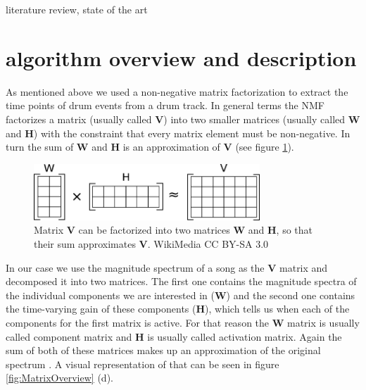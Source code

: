 \documentclass{article}
\begin{document}
\noindent\makebox[\linewidth]{\rule{\linewidth}{0.4pt}}
literature review, state of the art




\section{algorithm overview and description}
\label{sec:algo}

As mentioned above we used a non-negative matrix factorization to extract the time points of drum events from a drum track.
In general terms the NMF factorizes a matrix (usually called $\mathbf{V}$) into two smaller matrices (usually called $\mathbf{W}$ and $\mathbf{H}$) with the constraint that every matrix element must be non-negative.
In turn the sum of $\mathbf{W}$ and $\mathbf{H}$ is an approximation of $\mathbf{V}$ (see figure \ref{fig:NMF}).

\begin{figure}[htb]

\begin{minipage}[b]{1.0\linewidth}
  \centering
  \centerline{\includegraphics[width=8.5cm]{figures/NMF}}
  \medskip
\end{minipage}

\caption{Matrix $\mathbf{V}$ can be factorized into two matrices $\mathbf{W}$ and $\mathbf{H}$, so that their sum approximates $\mathbf{V}$. \scriptsize{\textsf{\textcopyright} WikiMedia CC BY-SA 3.0}}
\label{fig:NMF}

\end{figure}

In our case we use the magnitude spectrum of a song as the $\mathbf{V}$ matrix and decomposed it into two matrices.
The first one contains the magnitude spectra of the individual components we are interested in ($\mathbf{W}$) and the second one contains the time-varying gain of these components ($\mathbf{H}$), which tells us when each of the components for the first matrix is active.
For that reason the $\mathbf{W}$ matrix is usually called component matrix and $\mathbf{H}$ is usually called activation matrix.
Again the sum of both of these matrices makes up an approximation of the original spectrum \cite{smaragdis2003}.
A visual representation of that can be seen in figure \ref{fig:MatrixOverview} (d).
\end{document}

